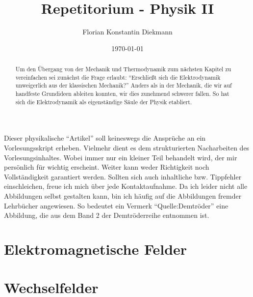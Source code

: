 
\title{Repetitorium - Physik II}
\author{Florian Konstantin Diekmann}
\date{\today}



\maketitle
\vspace{3cm}
\begin{abstract}
Um den Übergang von der Mechanik und Thermodynamik zum nächsten Kapitel zu vereinfachen sei zunächst die Frage erlaubt: "`Erschließt sich die Elektrodynamik unweigerlich aus der klassischen Mechanik?"' Anders als in der Mechanik, die wir auf handfeste Grundideen ableiten konnten, wir dies zunehmend schwerer fallen. So hat sich die Elektrodynamik als eigenständige Säule der Physik etabliert. 
\end{abstract}
  

Dieser physikalische "`Artikel"' soll keineswegs die Ansprüche an ein Vorlesungsskript erheben. Vielmehr dient es  
dem strukturierten Nacharbeiten des Vorlesungsinhaltes. Wobei immer nur ein kleiner Teil behandelt wird, der mir persönlich für wichtig erscheint. Weiter kann weder   Richtigkeit noch  Vollständigkeit  garantiert werden. Sollten sich auch  inhaltliche bzw. Tippfehler einschleichen, freue ich mich über jede Kontaktaufnahme.
Da ich leider nicht alle Abbildungen selbst gestalten kann, bin ich häufig auf die Abbildungen fremder Lehrbücher angewiesen. So bedeutet ein Vermerk "`Quelle:Demtröder"' eine Abbildung, die aus dem Band 2 der Demtröderreihe entnommen ist.
\newpage
\tableofcontents
\newpage
%
%

\newpage

\newpage


\section{Elektromagnetische Felder}
\section{Wechselfelder}

